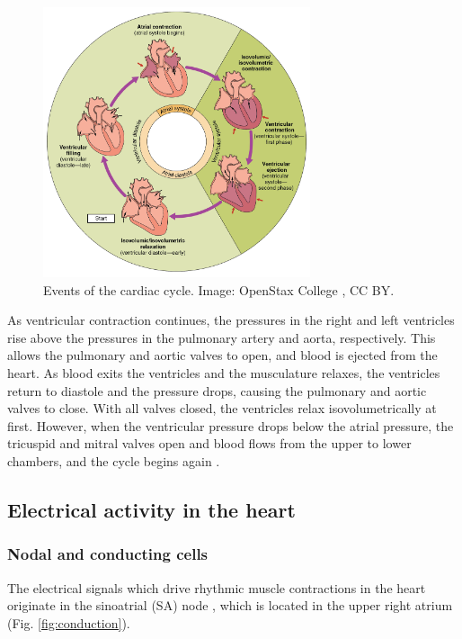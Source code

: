 \documentclass[12pt]{article}
\begin{document}
\begin{figure}[h!]
\centering
\includegraphics[width=0.7\textwidth]{figures/cardiacCycle.png}
\caption{Events of the cardiac cycle. Image: OpenStax College \citep{openStaxCycle}, CC BY.}
\label{fig:cycle}
\end{figure}

As ventricular contraction continues, the pressures in the right and left ventricles rise above the pressures in the pulmonary artery and aorta, respectively. This allows the pulmonary and aortic valves to open, and blood is ejected from the heart. As blood exits the ventricles and the musculature relaxes, the ventricles return to diastole and the pressure drops, causing the pulmonary and aortic valves to close. With all valves closed, the ventricles relax isovolumetrically at first. However, when the ventricular pressure drops below the atrial pressure, the tricuspid and mitral valves open and blood flows from the upper to lower chambers, and the cycle begins again \cite{guyton2016book,openStaxCycle}. 

\subsection*{Electrical activity in the heart}

\subsubsection*{Nodal and conducting cells}
  
The electrical signals which drive rhythmic muscle contractions in the heart originate in the sinoatrial (SA) node \cite{openStaxElectrical,mohrman2006cardiovascular}, which is located in the upper right atrium (Fig. \ref{fig:conduction}). 
\end{document}
